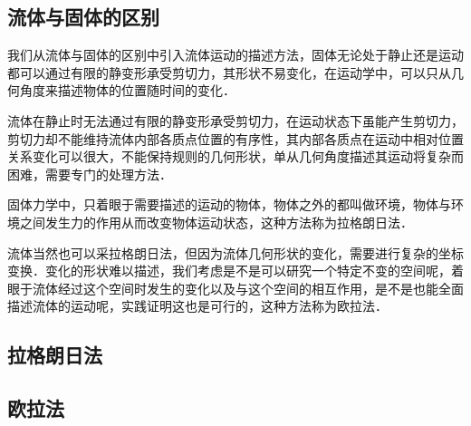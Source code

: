 \subsection{流体与固体的区别}
我们从流体与固体的区别中引入流体运动的描述方法，固体无论处于静止还是运动都可以通过有限的静变形承受剪切力，其形状不易变化，在运动学中，可以只从几何角度来描述物体的位置随时间的变化．

流体在静止时无法通过有限的静变形承受剪切力，在运动状态下虽能产生剪切力，剪切力却不能维持流体内部各质点位置的有序性，其内部各质点在运动中相对位置关系变化可以很大，不能保持规则的几何形状，单从几何角度描述其运动将复杂而困难，需要专门的处理方法．

固体力学中，只着眼于需要描述的运动的物体，物体之外的都叫做环境，物体与环境之间发生力的作用从而改变物体运动状态，这种方法称为拉格朗日法．

流体当然也可以采拉格朗日法，但因为流体几何形状的变化，需要进行复杂的坐标变换．变化的形状难以描述，我们考虑是不是可以研究一个特定不变的空间呢，着眼于流体经过这个空间时发生的变化以及与这个空间的相互作用，是不是也能全面描述流体的运动呢，实践证明这也是可行的，这种方法称为欧拉法．

\subsection{拉格朗日法}

\subsection{欧拉法}